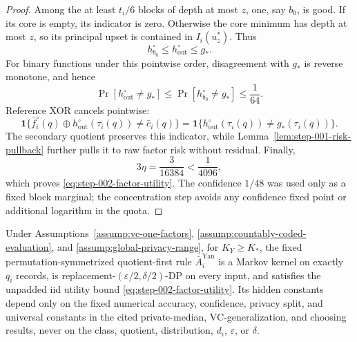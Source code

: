 \begin{proof}
Among the at least \(t_i/6\) blocks of depth at most \(z\), one, say
\(b_0\), is good.  If its core is empty, its indicator is zero.  Otherwise
the core minimum has depth at most \(z\), so its principal upset is contained
in \(I_i(u_z^*)\).  Thus
\begin{equation}\label{eq:step-002-shallow-comparison}
h_{b_0}^\circ\le h_{\mathrm{out}}^\circ\le g_*.
\end{equation}
For binary functions under this pointwise order, disagreement with \(g_*\)
is reverse monotone, and hence
\begin{equation}\label{eq:step-002-transformed-risk}
\Pr[h_{\mathrm{out}}^\circ\ne g_*]
\le\Pr[h_{b_0}^\circ\ne g_*]\le\frac1{64}.
\end{equation}
Reference XOR cancels pointwise:
\begin{equation}\label{eq:step-002-xor-risk}
\mathbf1\{\bar f_i^\circ(q)\oplus
h_{\mathrm{out}}^\circ(\tau_i(q))\ne\bar c_i(q)\}
=\mathbf1\{h_{\mathrm{out}}^\circ(\tau_i(q))
\ne g_*(\tau_i(q))\}.
\end{equation}
The secondary quotient preserves this indicator, while
Lemma~\ref{lem:step-001-risk-pullback} further pulls it to raw factor risk
without residual.  Finally,
\begin{equation}\label{eq:step-002-factor-failure}
3\eta=\frac3{16384}<\frac1{4096},
\end{equation}
which proves \eqref{eq:step-002-factor-utility}.  The confidence \(1/48\)
was used only as a fixed block marginal; the concentration step avoids any
confidence fixed point or additional logarithm in the quota.
\end{proof}

\begin{proposition}
\label{prop:step-002-factor-certificate}
Under Assumptions~\ref{assump:vc-one-factors},
\ref{assump:countably-coded-evaluation}, and
\ref{assump:global-privacy-range}, for \(K_Y\ge K_*\), the fixed
permutation-symmetrized quotient-first rule
\(\bar A_i^{\mathrm{Yan}}\) is a Markov kernel on exactly \(q_i\) records,
is replacement-\((\varepsilon/2,\delta/2)\)-DP on every input, and satisfies
the unpadded iid utility bound \eqref{eq:step-002-factor-utility}.  Its
hidden constants depend only on the fixed numerical accuracy, confidence,
privacy split, and universal constants in the cited private-median,
VC-generalization, and choosing results, never on the class, quotient,
distribution, \(d_i\), \(\varepsilon\), or \(\delta\).
\end{proposition}

